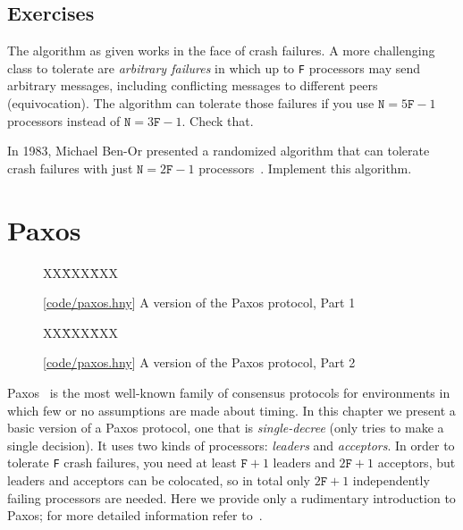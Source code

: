 \documentclass{report}
\newcommand{\harmonysource}[1]{
\begin{tabbing}
XX\=XXX\=XXX\kill
    
\end{tabbing}
}
\newcommand{\harmonylink}[1]{%
[\href{https://harmony.cs.cornell.edu/#1}{\underline{#1}}]%
}
\newenvironment{code}{
\tcolorbox
}{
\endtcolorbox
}
\begin{document}
\section*{Exercises}
\begin{problems}
\item The algorithm as given works in the face of crash failures.
A more challenging class to tolerate are \emph{arbitrary failures} in
which up to \texttt{F} processors may send arbitrary messages, including
conflicting messages to different peers (equivocation).
The algorithm can tolerate those failures if you use $\mathtt{N} = 5\mathtt{F} - 1$ processors instead of $\mathtt{N} = 3\mathtt{F} - 1$.  Check that.
\item In 1983, Michael Ben-Or presented a randomized algorithm that can
tolerate crash failures with
just $\mathtt{N} = 2\mathtt{F} - 1$ processors~\cite{BenOr83}.
Implement this algorithm.
\end{problems}

\chapter{Paxos}
\label{ch:paxos}

\begin{figure}
\begin{code}
\harmonysource{paxos1}
\end{code}
\caption{\harmonylink{code/paxos.hny} A version of the Paxos protocol, Part 1}
\label{fig:paxos1}
\end{figure}

\begin{figure}
\begin{code}
\harmonysource{paxos2}
\end{code}
\caption{\harmonylink{code/paxos.hny} A version of the Paxos protocol, Part 2}
\label{fig:paxos2}
\end{figure}

Paxos~\cite{Paxos} is the most well-known family of consensus protocols for
environments in which few or no assumptions are made about timing.
In this chapter we present a basic version of a Paxos protocol, one that is
\emph{single-decree} (only tries to make a single decision).
It uses two kinds of processors: \emph{leaders} and \emph{acceptors}.
In order to tolerate \texttt{F} crash failures, you need at least $\texttt{F}+1$ leaders
and $2\texttt{F} + 1$ acceptors, but leaders and acceptors can be colocated, so
in total only $2\texttt{F} + 1$ independently failing processors are needed.
Here we provide only a rudimentary introduction to Paxos; for more detailed
information refer to~\cite{Paxos}.
\end{document}
